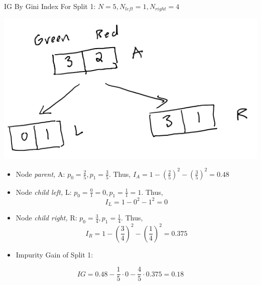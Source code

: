 \documentclass[
  ignorenonframetext,
]{beamer}
\begin{document}
\begin{frame}{IG By Gini Index}
\protect\hypertarget{ig-by-gini-index}{}
For Split 1: \(N = 5, N_{left} =1, N_{right} = 4\)

\includegraphics{images/im1.png}

\begin{itemize}
\item
  Node \emph{parent,} A: \(p_0 = \frac{2}{5}, p_1 = \frac{3}{5}\). Thus,
  \(I_{A} = 1 - (\frac{2}{5})^2-(\frac{3}{5})^2 = 0.48\)
\item
  Node \emph{child left,} L:
  \(p_0 = \frac{0}{1} = 0, p_1 = \frac{1}{1} = 1\). Thus,
  \[I_{L} = 1 -0^2-1^2 = 0\]
\item
  Node \emph{child right,} R: \(p_0 = \frac{3}{4}, p_1 = \frac{1}{4}\).
  Thus, \[I_{R} = 1-(\frac{3}{4})^2-(\frac{1}{4})^2 = 0.375\]
\item
  Impurity Gain of Split 1:
\end{itemize}

\[IG = 0.48 - \frac{1}{5} \cdot 0-\frac{4}{5} \cdot 0.375 = 0.18\]
\end{frame}
\end{document}
